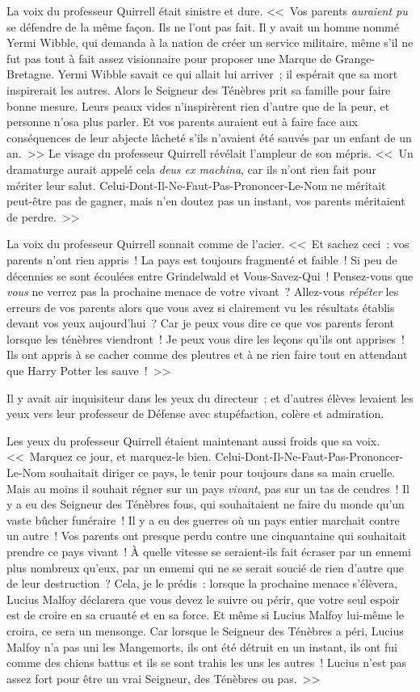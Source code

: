 La voix du professeur Quirrell était sinistre et dure. <<~Vos parents \emph{auraient pu} se défendre de la même façon. Ils ne l'ont pas fait. Il y avait un homme nommé Yermi Wibble, qui demanda à la nation de créer un service militaire, même s'il ne fut pas tout à fait assez visionnaire pour proposer une Marque de Grange-Bretagne. Yermi Wibble savait ce qui allait lui arriver~; il espérait que sa mort inspirerait les autres. Alors le Seigneur des Ténèbres prit sa famille pour faire bonne mesure. Leurs peaux vides n'inspirèrent rien d'autre que de la peur, et personne n'osa plus parler. Et vos parents auraient eut à faire face aux conséquences de leur abjecte lâcheté s'ils n'avaient été sauvés par un enfant de un an.~>> Le visage du professeur Quirrell révélait l'ampleur de son mépris. <<~Un dramaturge aurait appelé cela \emph{deus ex machina}, car ils n'ont rien fait pour mériter leur salut. Celui-Dont-Il-Ne-Faut-Pas-Prononcer-Le-Nom ne méritait peut-être pas de gagner, mais n'en doutez pas un instant, vos parents méritaient de perdre.~>>

La voix du professeur Quirrell sonnait comme de l'acier. <<~Et sachez ceci~: vos parents n'ont rien appris~! La pays est toujours fragmenté et faible~! Si peu de décennies se sont écoulées entre Grindelwald et Vous-Savez-Qui~! Pensez-vous que \emph{vous} ne verrez pas la prochaine menace de votre vivant~? Allez-vous \emph{répéter} les erreurs de vos parents alors que vous avez si clairement vu les résultats établis devant vos yeux aujourd'hui~? Car je peux vous dire ce que vos parents feront lorsque les ténèbres viendront~! Je peux vous dire les leçons qu'ils ont apprises~! Ils ont appris à se cacher comme des pleutres et à ne rien faire tout en attendant que Harry Potter les sauve~!~>>

Il y avait air inquisiteur dans les yeux du directeur~; et d'autres élèves levaient les yeux vers leur professeur de Défense avec stupéfaction, colère et admiration.

Les yeux du professeur Quirrell étaient maintenant aussi froids que sa voix. <<~Marquez ce jour, et marquez-le bien. Celui-Dont-Il-Ne-Faut-Pas-Prononcer-Le-Nom souhaitait diriger ce pays, le tenir pour toujours dans sa main cruelle. Mais au moins il souhait régner sur un pays \emph{vivant}, pas sur un tas de cendres~! Il y a eu des Seigneur des Ténèbres fous, qui souhaitaient ne faire du monde qu'un vaste bûcher funéraire~! Il y a eu des guerres où un pays entier marchait contre un autre~! Vos parents ont presque perdu contre une cinquantaine qui souhaitait prendre ce pays vivant~! À quelle vitesse se seraient-ils fait écraser par un ennemi plus nombreux qu'eux, par un ennemi qui ne se serait soucié de rien d'autre que de leur destruction~? Cela, je le prédis~: lorsque la prochaine menace s'élèvera, Lucius Malfoy déclarera que vous devez le suivre ou périr, que votre seul espoir est de croire en sa cruauté et en sa force. Et même si Lucius Malfoy lui-même le croira, ce sera un mensonge. Car lorsque le Seigneur des Ténèbres a péri, Lucius Malfoy n'a pas uni les Mangemorts, ils ont été détruit en un instant, ils ont fui comme des chiens battus et ils se sont trahis les uns les autres~! Lucius n'est pas assez fort pour être un vrai Seigneur, des Ténèbres ou pas.~>>

